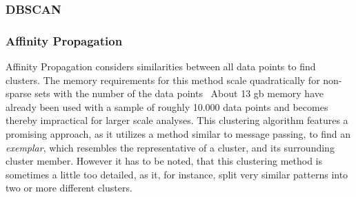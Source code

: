 \subsubsection{DBSCAN}

\subsubsection{Affinity Propagation}
Affinity Propagation considers similarities between all data points to find clusters.
The memory requirements for this method scale quadratically for non-sparse sets with the number of the data points~\cite[p.~ii]{article:Frey972}
About 13 \ac{gb} memory have already been used with a sample of roughly 10.000 data points and becomes thereby impractical for larger scale analyses.
This clustering algorithm features a promising approach, as it utilizes a method similar to message passing, to find an \emph{exemplar}, which resembles the representative of a cluster, and its surrounding cluster member.
However it has to be noted, that this clustering method is sometimes a little too detailed, as it, for instance, split very similar patterns into two or more different clusters.


